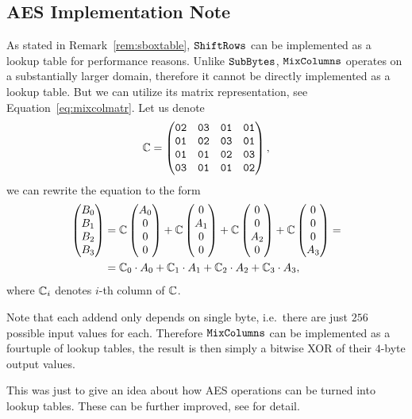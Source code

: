 \subsection{AES Implementation Note}
\label{sec:aeslookup}

As stated in Remark~\ref{rem:sboxtable}, $\texttt{ShiftRows}$ can be implemented as a lookup table for performance reasons. Unlike $\texttt{SubBytes}$, $\texttt{MixColumns}$ operates on a substantially larger domain, therefore it cannot be directly implemented as a lookup table. But we can utilize its matrix representation, see Equation~\ref{eq:mixcolmatr}. Let us denote
\[
	\mathbb{C} =
	\begin{pmatrix}
		\texttt{02} & \texttt{03} & \texttt{01} & \texttt{01} \\
		\texttt{01} & \texttt{02} & \texttt{03} & \texttt{01} \\
		\texttt{01} & \texttt{01} & \texttt{02} & \texttt{03} \\
		\texttt{03} & \texttt{01} & \texttt{01} & \texttt{02}
	\end{pmatrix} ,
\]
we can rewrite the equation to the form
\begin{align*}
	\begin{pmatrix}
			B_0 \\ B_1 \\ B_2 \\ B_3
		\end{pmatrix}
		&=
		\mathbb{C}
		\begin{pmatrix}
			A_0 \\ 0 \\ 0 \\ 0
		\end{pmatrix}
		+
		\mathbb{C}
		\begin{pmatrix}
			0 \\ A_1 \\ 0 \\ 0
		\end{pmatrix}
		+
		\mathbb{C}
		\begin{pmatrix}
			0 \\ 0 \\ A_2 \\ 0
		\end{pmatrix}
		+
		\mathbb{C}
		\begin{pmatrix}
			0 \\ 0 \\ 0 \\ A_3
		\end{pmatrix}
		= \\
		&=
		\mathbb{C}_0 \cdot A_0   
		 +
		\mathbb{C}_1 \cdot A_1  
		 +
		\mathbb{C}_2 \cdot A_2 
		 +
		\mathbb{C}_3 \cdot A_3 ,
\end{align*}
where $\mathbb{C}_i$ denotes $i$-th column of $\mathbb{C}$.

Note that each addend only depends on single byte, i.e.\ there are just $256$ possible input values for each. Therefore $\texttt{MixColumns}$ can be implemented as a fourtuple of lookup tables, the result is then simply a bitwise XOR of their $4$-byte output values.

This was just to give an idea about how AES operations can be turned into lookup tables. These can be further improved, see \cite[Chapter~4]{daemen2013rijndael} for detail.
